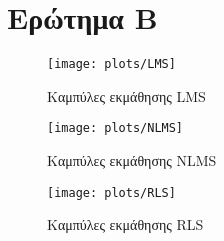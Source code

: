 \section{Ερώτημα Β}
\begin{figure}[H]
\texttt{[image: plots/LMS]}
\caption{Καμπύλες εκμάθησης LMS}
\label{fig:lms}
\end{figure}
\begin{figure}[H]
\texttt{[image: plots/NLMS]}
\caption{Καμπύλες εκμάθησης NLMS}
\label{fig:nmls}
\end{figure}
\begin{figure}[H]
\texttt{[image: plots/RLS]}
\caption{Καμπύλες εκμάθησης RLS}
\label{fig:rls}
\end{figure}
